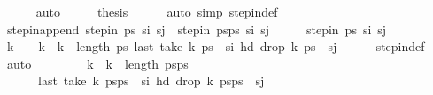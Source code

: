 \begin{isabellebody}
\ \ \ \ \isamarkupfalse%
\ auto\isanewline
\ \ \isamarkupfalse%
\ \isamarkupfalse%
\ {\isacharquery}{\kern0pt}thesis\isanewline
\ \ \ \ \isamarkupfalse%
\ {\isacharparenleft}{\kern0pt}auto\ simp{\isacharcolon}{\kern0pt}\ step{\isacharunderscore}{\kern0pt}in{\isacharunderscore}{\kern0pt}def{\isacharparenright}{\kern0pt}\isanewline
{}\isamarkupfalse%
%
\endisatagproof
{\isafoldproof}%
%
\isadelimproof
\isanewline
%
\endisadelimproof
\isanewline
{}\isamarkupfalse%
\ step{\isacharunderscore}{\kern0pt}in{\isacharunderscore}{\kern0pt}append{\isacharcolon}{\kern0pt}\ {\isachardoublequoteopen}step{\isacharunderscore}{\kern0pt}in\ ps\ s\isactrlsub i\ s\isactrlsub j\ {\isasymLongrightarrow}\ step{\isacharunderscore}{\kern0pt}in\ {\isacharparenleft}{\kern0pt}ps{\isacharat}{\kern0pt}ps{\isacharprime}{\kern0pt}{\isacharparenright}{\kern0pt}\ s\isactrlsub i\ s\isactrlsub j{\isachardoublequoteclose}\isanewline
%
\isadelimproof
%
\endisadelimproof
%
\isatagproof
{}\isamarkupfalse%
\ {\isacharminus}{\kern0pt}\isanewline
\ \ \isamarkupfalse%
\ {\isachardoublequoteopen}step{\isacharunderscore}{\kern0pt}in\ ps\ s\isactrlsub i\ s\isactrlsub j{\isachardoublequoteclose}\isanewline
\ \ \isamarkupfalse%
\ \isamarkupfalse%
\ k\ \ {\isachardoublequoteopen}{}\ {\isacharless}{\kern0pt}\ k\ {\isasymand}\ k\ {\isacharless}{\kern0pt}\ length\ ps{\isachardoublequoteclose}\ {\isachardoublequoteopen}last\ {\isacharparenleft}{\kern0pt}take\ k\ ps{\isacharparenright}{\kern0pt}\ {\isacharequal}{\kern0pt}\ s\isactrlsub i{\isachardoublequoteclose}\ {\isachardoublequoteopen}hd\ {\isacharparenleft}{\kern0pt}drop\ k\ ps{\isacharparenright}{\kern0pt}\ {\isacharequal}{\kern0pt}\ s\isactrlsub j{\isachardoublequoteclose}\isanewline
\ \ \ \ \isamarkupfalse%
\ step{\isacharunderscore}{\kern0pt}in{\isacharunderscore}{\kern0pt}def\ \isamarkupfalse%
\ auto\ \isanewline
\ \ \isamarkupfalse%
\ \isamarkupfalse%
\ {\isachardoublequoteopen}{}\ {\isacharless}{\kern0pt}\ k\ {\isasymand}\ k\ {\isacharless}{\kern0pt}\ length\ {\isacharparenleft}{\kern0pt}ps{\isacharat}{\kern0pt}ps{\isacharprime}{\kern0pt}{\isacharparenright}{\kern0pt}{\isachardoublequoteclose}\ \isanewline
\ \ \ \ \ \ {\isachardoublequoteopen}last\ {\isacharparenleft}{\kern0pt}take\ k\ {\isacharparenleft}{\kern0pt}ps{\isacharat}{\kern0pt}ps{\isacharprime}{\kern0pt}{\isacharparenright}{\kern0pt}{\isacharparenright}{\kern0pt}\ {\isacharequal}{\kern0pt}\ s\isactrlsub i{\isachardoublequoteclose}\ {\isachardoublequoteopen}hd\ {\isacharparenleft}{\kern0pt}drop\ k\ {\isacharparenleft}{\kern0pt}ps{\isacharat}{\kern0pt}ps{\isacharprime}{\kern0pt}{\isacharparenright}{\kern0pt}{\isacharparenright}{\kern0pt}\ {\isacharequal}{\kern0pt}\ s\isactrlsub j{\isachardoublequoteclose}\isanewline

\end{isabellebody}
